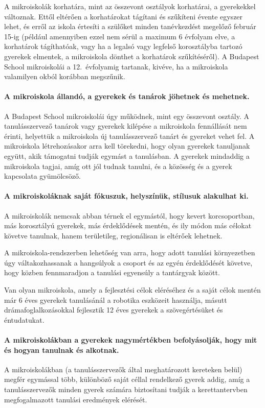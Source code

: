 A mikroiskolák korhatára, mint az összevont osztályok korhatárai, a gyerekekkel változnak. Ettől eltérően a korhatárokat tágítani és szűkíteni évente egyszer lehet, és erről az iskola értesíti a szülőket minden tanévkezdést megelőző február 15-ig (például amennyiben ezzel nem sérül a maximum 6 évfolyam elve, a korhatárok tágíthatóak, vagy ha a legalsó vagy legfelső korosztályba tartozó gyerekek elmentek, a mikroiskola dönthet a korhatárok szűkítéséről). A Budapest School mikroiskolái a 12.~évfolyamig tartanak, kivéve, ha a mikroiskola valamilyen okból korábban megszűnik.

\paragraph{A mikroiskola állandó, a gyerekek és tanárok jöhetnek és mehetnek.}
A Budapest School mikroiskolái úgy működnek, mint egy összevont osztály. A tanulásszervező tanárok vagy gyerekek kilépése a mikroiskola fennállását nem érinti, helyettük a mikroiskola új tanulásszervező tanárt és gyereket vehet fel.  A mikroiskola létrehozásakor arra kell törekedni, hogy olyan gyerekek tanuljanak együtt, akik támogatni tudják egymást a tanulásban. A gyerekek mindaddig a mikroiskola tagjai, amíg ott jól tudnak tanulni, és a közösség és a gyerek kapcsolata gyümölcsöző.

\paragraph{A mikroiskoláknak saját fókuszuk, helyszínük, stílusuk alakulhat ki.}
A mikroiskolák nemcsak abban térnek el egymástól, hogy kevert korcsoportban, más korosztályú gyerekek, más érdeklődések mentén, és ily módon más célokat követve tanulnak, hanem területileg, regionálisan is eltérőek lehetnek.

A mikroiskola-rendszerben lehetőség van arra, hogy adott tanulási környezetben úgy váltakozhassanak a hangsúlyok a csoport és az egyén érdeklődését követve, hogy közben fennmaradjon a tanulási egyensúly a tantárgyak között.

Van olyan mikroiskola, amely a fejlesztési célok eléréséhez és a saját célok mentén már 6 éves gyerekek tanulásánál a robotika eszközeit használja, másutt drámafoglalkozásokkal fejlesztik 12 éves gyerekek a szövegértésüket és éntudatukat.

\paragraph{A mikroiskolákban a gyerekek nagymértékben befolyásolják, hogy mit és hogyan tanulnak és alkotnak.}
A mikroiskolákban (a tanulásszervezők által meghatározott kereteken
belül) megfér egymással több, különböző saját céllal rendelkező gyerek
addig, amíg a tanulásszervezők minden gyerek számára biztosítani
tudják a kerettantervben megfogalmazott tanulási\linebreak
eredmények elérését.

